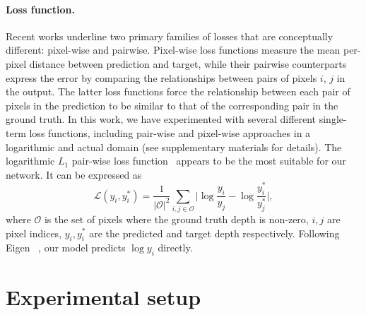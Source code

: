 \documentclass[final]{cvpr}
\begin{document}
    \paragraph{Loss function.}

    Recent works underline two primary families of losses that are conceptually different: pixel-wise and pairwise. Pixel-wise loss functions measure the mean per-pixel distance between prediction and target, while their pairwise counterparts express the error by comparing the relationships between pairs of pixels $i$, $j$ in the output. The latter loss functions force the relationship between each pair of pixels in the prediction to be similar to that of the corresponding pair in the ground truth. In this work, we have experimented with several different single-term loss functions, including pair-wise and pixel-wise approaches in a logarithmic and actual domain (see supplementary materials for details). The logarithmic $L_1$ pair-wise loss function~\cite{romanov2020general} appears to be the most suitable for our network. It can be expressed as
$$
            \mathcal{L}(y_i, y_i^*) = \frac{1}{|\mathcal{O}|^2} \sum_{i, j \in \mathcal{O}} \bigg| \log \frac{y_i}{y_j} - \log \frac{y_i^*}{y_j^*} \bigg|,
    $$
where $\mathcal{O}$ is the set of pixels where the ground truth depth is non-zero, $i,j$ are pixel indices, $y_i, y^*_i$ are the predicted and target depth respectively. Following Eigen \etal~\cite{eigen_fergus}, our model predicts $\log y_i$ directly.
    
    \section{Experimental setup}\label{sec:experiments}
\end{document}
